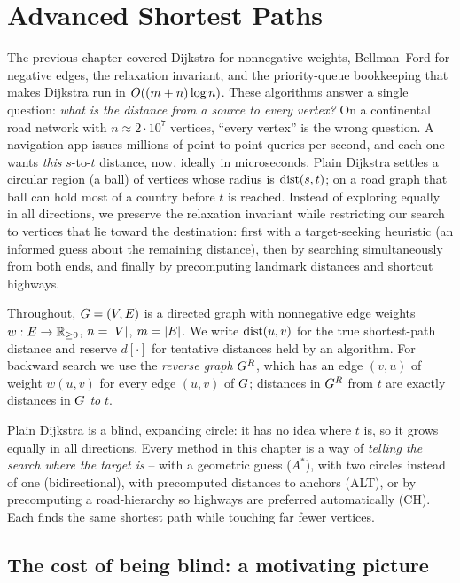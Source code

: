 \chapter{Advanced Shortest Paths}

The previous chapter covered Dijkstra for nonnegative
weights, Bellman--Ford for negative edges, the relaxation invariant, and the
priority-queue bookkeeping that makes Dijkstra run in $O((m+n)\log n)$. These algorithms answer a single question: \emph{what is the distance from a
source to every vertex?} On a continental road network with $n \approx 2\cdot
10^7$ vertices, ``every vertex'' is the wrong question. A navigation app issues
millions of point-to-point queries per second, and each one wants
\emph{this} $s$-to-$t$ distance, now, ideally in microseconds. Plain Dijkstra
settles a circular region (a ball) of vertices whose radius is $\operatorname{dist}(s,t)$; on a road graph that
ball can hold most of a country before $t$ is reached. Instead of exploring equally in all directions, we preserve the relaxation
invariant while restricting our search to vertices that lie toward
the destination: first with a target-seeking heuristic (an informed guess about the remaining distance), then by searching
simultaneously from both ends, and finally by precomputing landmark distances
and shortcut highways.

Throughout, $G=(V,E)$ is a directed graph with nonnegative edge weights
$w:E\to\mathbb{R}_{\ge 0}$, $n=\lvert V\rvert$, $m=\lvert E\rvert$. We write $\operatorname{dist}(u,v)$ for the true
shortest-path distance and reserve $d[\cdot]$ for tentative distances held by an
algorithm. For backward search we use the \emph{reverse graph} $G^{R}$, which
has an edge $(v,u)$ of weight $w(u,v)$ for every edge $(u,v)$ of $G$;
distances in $G^{R}$ from $t$ are exactly distances in $G$ \emph{to} $t$.

\begin{intuitionbox}
Plain Dijkstra is a blind, expanding circle: it has no idea where $t$ is, so it
grows equally in all directions. Every method in this chapter is a way of
\emph{telling the search where the target is} -- with a geometric guess
($A^*$), with two circles instead of one (bidirectional), with precomputed
distances to anchors (ALT), or by precomputing a road-hierarchy so highways are
preferred automatically (CH). Each finds the same shortest path while touching far fewer
vertices.
\end{intuitionbox}

\section{The cost of being blind: a motivating picture}
\label{ch08:motivation}

